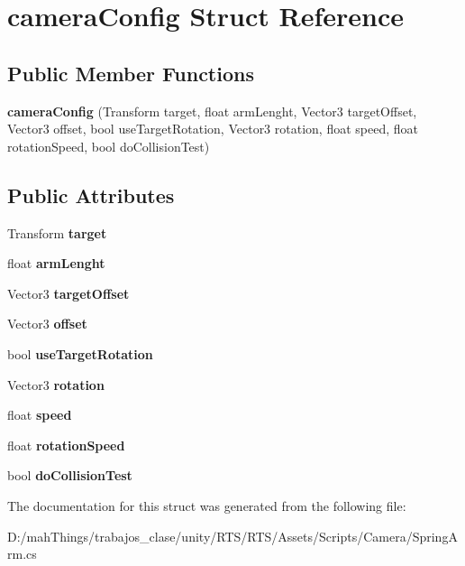 \hypertarget{structcamera_config}{}\section{camera\+Config Struct Reference}
\label{structcamera_config}
\subsection*{Public Member Functions}
\begin{DoxyCompactItemize}
\item 
\mbox{\label{structcamera_config_ac13ab8713fd0587ad7394d65ed3f6bab}} 
{\bfseries camera\+Config} (Transform target, float arm\+Lenght, Vector3 target\+Offset, Vector3 offset, bool use\+Target\+Rotation, Vector3 rotation, float speed, float rotation\+Speed, bool do\+Collision\+Test)
\end{DoxyCompactItemize}
\subsection*{Public Attributes}
\begin{DoxyCompactItemize}
\item 
\mbox{\label{structcamera_config_a9ece2c03829af516b5603958918e8654}} 
Transform {\bfseries target}
\item 
\mbox{\label{structcamera_config_a098d58241dac8062877f5077a9670aa1}} 
float {\bfseries arm\+Lenght}
\item 
\mbox{\label{structcamera_config_ab7ca18bad889b11ff718965808c8dc9f}} 
Vector3 {\bfseries target\+Offset}
\item 
\mbox{\label{structcamera_config_aa6a4c25afad15f19fcc21d4870ecabf2}} 
Vector3 {\bfseries offset}
\item 
\mbox{\label{structcamera_config_a8b594db92343119c2e9be5ca3bc2a5ff}} 
bool {\bfseries use\+Target\+Rotation}
\item 
\mbox{\label{structcamera_config_a9e6b1fe75155f0cf8364b8fd6b5c8775}} 
Vector3 {\bfseries rotation}
\item 
\mbox{\label{structcamera_config_ab7dc9ac3b6fadd57997ae78ad45d6186}} 
float {\bfseries speed}
\item 
\mbox{\label{structcamera_config_af310e1d44097b2ede492ba1f1384285a}} 
float {\bfseries rotation\+Speed}
\item 
\mbox{\label{structcamera_config_aec2ae0a23b6a0c12b12c61e268203693}} 
bool {\bfseries do\+Collision\+Test}
\end{DoxyCompactItemize}


The documentation for this struct was generated from the following file\+:\begin{DoxyCompactItemize}
\item 
D\+:/mah\+Things/trabajos\+\_\+clase/unity/\+R\+T\+S/\+R\+T\+S/\+Assets/\+Scripts/\+Camera/Spring\+Arm.\+cs\end{DoxyCompactItemize}

